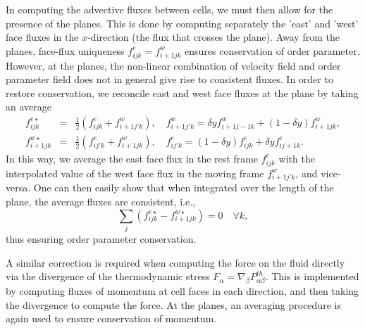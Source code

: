 In computing the advective fluxes between cells, we must then
allow for the presence of the planes. This is done by computing
separately the 'east' and 'west' face fluxes in the $x$-direction
(the flux that crosses the plane). Away from the planes, face-flux
uniqueness $f_{ijk}^e = f_{i+1jk}^w$ ensures conservation of order
parameter. However, at the planes, the non-linear combination of
velocity field and order parameter field does not in general give
rise to consistent fluxes. In order to restore conservation, we
reconcile east and west face fluxes at the plane by taking an
average
\begin{eqnarray}
f_{ijk}^{e\star}&=&{\textstyle\frac{1}{2}}(f_{ijk}^e + f_{i+1j'k}^w),\quad 
f_{i+1j'k}^w  = \delta y f_{i+1 j-1 k}^w + (1 - \delta y) f_{i+1jk}^w,\\
f_{i+1 j k}^{w\star} &=& {\textstyle\frac{1}{2}}(f_{ij'k}^e + f_{i+1jk}^w),\quad
f_{ij'k}^e = (1 - \delta y) f_{ijk}^e + \delta y f_{ij+1k}^e.
\end{eqnarray}
In this way, we average the east face flux in the rest frame $f_{ijk}^e$
with the interpolated value of the west face flux in the moving frame
$f_{i+1j'k}^w$, and vice-versa. One can then easily show that when
integrated over the length of the plane, the average fluxes are
consistent, i.e.,
\begin{equation}
\sum_j (f_{ijk}^{e\star} - f_{i+1jk}^{w\star}) = 0 \quad\forall k,
\end{equation}
thus ensuring order parameter conservation.

A similar correction is required when computing the force on the fluid
directly via the divergence of the thermodynamic stress
$F_\alpha = \nabla_\beta P_{\alpha\beta}^{th}$. This is implemented
by computing fluxes of momentum at cell faces in each direction, and
then taking the divergence to compute the force. At the planes, an
averaging procedure is again used to ensure conservation of momentum.



\vfill
\pagebreak
